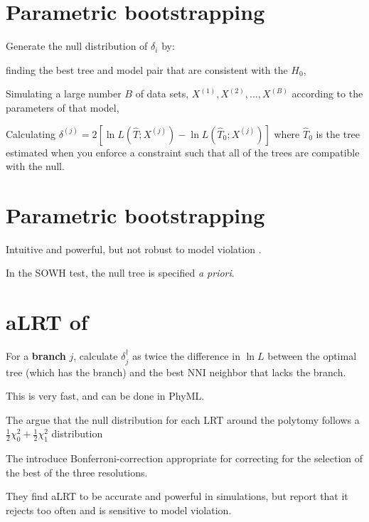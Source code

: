 \documentclass[landscape]{foils}
\begin{document}
\myNewSlide
\section*{Parametric bootstrapping}
Generate the null distribution of $\delta_i$ by:
\begin{compactitem}
	\item finding the best tree and model pair that are consistent with the $H_0$,
	\item Simulating a large number $B$ of data sets, $X^{(1)}, X^{(2)},\ldots,X^{(B)}$ according to the parameters of that model,
	\item Calculating $\delta^{(j)} = 2\left[\ln L (\hat{T}; X^{(j)}) - \ln L (\hat{T}_{0}; X^{(j)})\right]$ where $\hat{T}_{0}$ is the tree estimated when you enforce a constraint such that all of the trees are compatible with the null.
\end{compactitem}

\myNewSlide
\section*{Parametric bootstrapping}
Intuitive and powerful, but not robust to model violation \citep{Buckley2002}.

In the SOWH test, the null tree is specified {\em a priori}.

\myNewSlide
 


\myNewSlide
 

\myNewSlide
\section*{aLRT of \citet{AnisimovaG2006}}
\begin{compactitem}
	\item For a {\bf branch} $j$, calculate $\delta_{j}^{\dag}$ as twice the difference in $\ln L$ between the optimal tree (which has the branch) and the best NNI neighbor that lacks the branch.
	\item This is very fast, and can be done in PhyML.
	\item The argue that the null distribution for each LRT around the polytomy follows a $\frac{1}{2}\chi_0^2 + \frac{1}{2}\chi_1^2$ distribution
	\item The introduce Bonferroni-correction appropriate for correcting for the selection of the best of the three resolutions.
	\item They find aLRT to be accurate and powerful in simulations, but \citet{AnisimovaGDDG2011} report that it rejects too often and is sensitive to model violation.
\end{compactitem}
\end{document}
